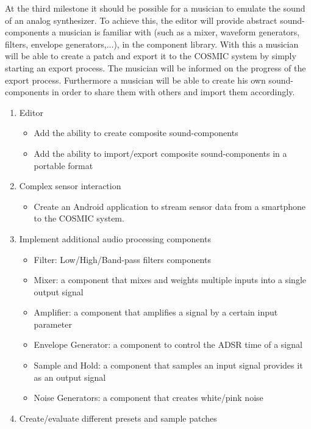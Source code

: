 At the third milestone it should be possible for a musician to emulate the sound of an analog synthesizer. 
To achieve this, the editor will provide abstract sound-components a musician is familiar with (such as a mixer, waveform generators, filters, envelope generators,...), in the component library. 
With this a musician will be able to create a patch and export it to the \ac{COSMIC} system by simply starting an export process. 
The musician will be informed on the progress of the export process. 
Furthermore a musician will be able to create his own sound-components in order to share them with others and import them accordingly.

	\begin{enumerate}
		\item Editor
			\begin{itemize}
				\item Add the ability to create composite sound-components
				\item Add the ability to import/export composite sound-components in a portable format
			\end{itemize}
		\item Complex sensor interaction
			\begin{itemize}
				\item Create an Android application to stream sensor data from a smartphone to the \ac{COSMIC} system.
			\end{itemize}
		\item Implement additional audio processing components	
			\begin{itemize}
				\item Filter: Low/High/Band-pass filters components
				\item Mixer: a component that mixes and weights multiple inputs into a single output signal
				\item Amplifier: a component that amplifies a signal by a certain input parameter
				\item Envelope Generator: a component to control the \ac{ADSR} time of a signal
				\item Sample and Hold: a component that samples an input signal provides it as an output signal
				\item Noise Generators: a component that creates white/pink noise
			\end{itemize}
		\item Create/evaluate different presets and sample patches
	\end{enumerate}
	
